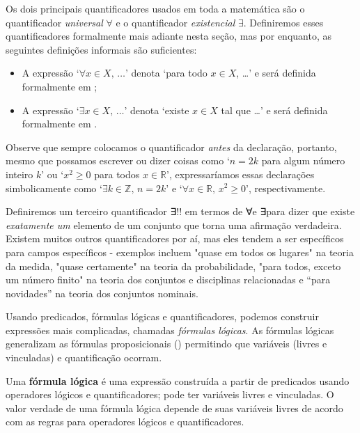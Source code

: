 Os dois principais quantificadores usados ​​em toda a matemática são o quantificador \textit{universal} $\forall$ e o quantificador \textit{existencial} $\exists$. Definiremos esses quantificadores formalmente mais adiante nesta seção, mas por enquanto, as seguintes definições informais são suficientes:

\begin{itemize}
\item A expressão `$\forall x \in X,\, \dots{}$' denota `para todo $x \in X$, \dots{}' e será definida formalmente em ;
\item A expressão `$\exists x \in X,\, \dots{}$' denota `existe $x \in X$ tal que \dots{}' e será definida formalmente em .
\end{itemize}

Observe que sempre colocamos o quantificador \textit{antes} da declaração, portanto, mesmo que possamos escrever ou dizer coisas como `$n=2k$ para algum número inteiro $k$' ou `$x^2 \ge 0$ para todos $x \in \mathbb{R}$', expressaríamos essas declarações simbolicamente como `$\exists k \in \mathbb{Z},\, n=2k$' e `$\forall x \in \mathbb{ R},\, x^2 \ge 0$', respectivamente.

Definiremos um terceiro quantificador ∃!\exists ! em termos de ∀\forall e ∃\exists para dizer que existe \textit{exatamente um} elemento de um conjunto que torna uma afirmação verdadeira. Existem muitos outros quantificadores por aí, mas eles tendem a ser específicos para campos específicos - exemplos incluem "quase em todos os lugares" na teoria da medida, "quase certamente" na teoria da probabilidade, "para todos, exceto um número finito" na teoria dos conjuntos e disciplinas relacionadas e “para novidades” na teoria dos conjuntos nominais.

Usando predicados, fórmulas lógicas e quantificadores, podemos construir expressões mais complicadas, chamadas \textit{fórmulas lógicas}. As fórmulas lógicas generalizam as fórmulas proposicionais () permitindo que variáveis ​​​​(livres e vinculadas) e quantificação ocorram.
\begin{definition}
\label{defLogicalFormula}
Uma \textbf{fórmula lógica} é uma expressão construída a partir de predicados usando operadores lógicos e quantificadores; pode ter variáveis ​​livres e vinculadas. O valor verdade de uma fórmula lógica depende de suas variáveis ​​livres de acordo com as regras para operadores lógicos e quantificadores.
\end{definition}


